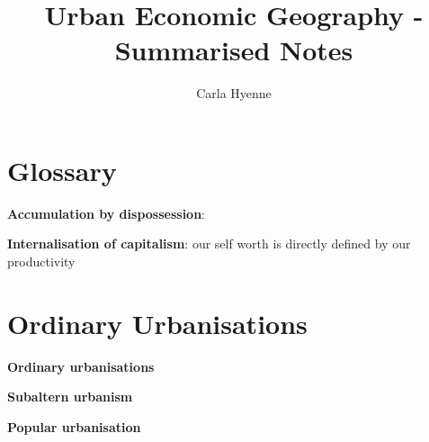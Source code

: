 \documentclass{article}
\title{Urban Economic Geography - Summarised Notes}
\author{Carla Hyenne }
\begin{document}
\maketitle

\tableofcontents

\pagebreak

\section{Glossary}

\textbf{Accumulation by dispossession}:

\textbf{Internalisation of capitalism}: our self worth is directly defined by our productivity

\section{Ordinary Urbanisations}

\textbf{Ordinary urbanisations}

\textbf{Subaltern urbanism}

\textbf{Popular urbanisation}


\textbf{}


\textbf{}


\textbf{}
\end{document}
